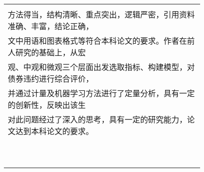\begin{table}[h]
\begin{tabular}{|p{0.2\linewidth}p{0.2\linewidth}p{0.2\linewidth}p{0.2\linewidth}|}
{      }\\
      \multicolumn{4}{|l|}{
      方法得当，结构清晰、重点突出，逻辑严密，引用资料准确、丰富，结论正确，

      }\\
      \multicolumn{4}{|l|}{
      文中用语和图表格式等符合本科论文的要求。作者在前人研究的基础上，从宏

      }\\
      \multicolumn{4}{|l|}{
      观、中观和微观三个层面出发选取指标、构建模型，对债券违约进行综合评价，

      }\\
      \multicolumn{4}{|l|}{
      并通过计量及机器学习方法进行了定量分析，具有一定的创新性，反映出该生

      }\\
      \multicolumn{4}{|l|}{
      对此问题经过了深入的思考，具有一定的研究能力，论文达到本科论文的要求。}\\
		\multicolumn{4}{|l|}{}                                                                                                 \\
		\multicolumn{4}{|l|}{}                                                                                                 \\
		\multicolumn{4}{|l|}{}                                                                                                 \\
		\multicolumn{4}{|l|}{}                                                                                                 \\
		\multicolumn{4}{|l|}{}                                                                                                 \\
		\multicolumn{4}{|l|}{}                                                                                                 \\
		\multicolumn{4}{|l|}{}                                                                                                 \\
		\multicolumn{4}{|l|}{}                                                                                                 \\
		\multicolumn{4}{|l|}{}                                                                                                 \\
		\multicolumn{4}{|l|}{}                                                                                                 \\

\end{tabular}
\end{table}

